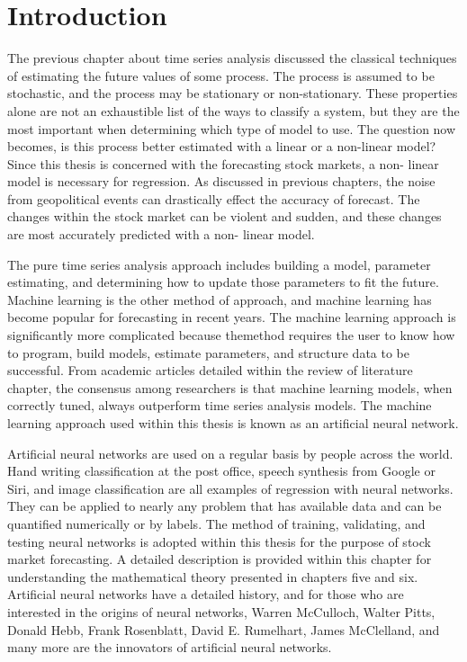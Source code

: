 \documentclass[../main.tex]{subfiles}
\begin{document}
    \section{Introduction}\label{sec:introduction2}
    The previous chapter about time series analysis discussed the classical techniques of estimating the future values of some process.
    The process is assumed to be stochastic, and the process may be stationary or non-stationary.
    These properties alone are not an exhaustible list of the ways to classify a system, but they are the most important when determining which type of model to use.
    The question now becomes, is this process better estimated with a linear or a non-linear model?
    Since this thesis is concerned with the forecasting stock markets, a non- linear model is necessary for regression.
    As discussed in previous chapters, the noise from geopolitical events can drastically effect the accuracy of forecast.
    The changes within the stock market can be violent and sudden, and these changes are most accurately predicted with a non- linear model.

    The pure time series analysis approach includes building a model, parameter estimating, and determining how to update those parameters to fit the future.
    Machine learning is the other method of approach, and machine learning has become popular for forecasting in recent years.
    The machine learning approach is significantly more complicated because themethod requires the user to know how to program, build models, estimate parameters, and structure data to be successful.
    From academic articles detailed within the review of literature chapter, the consensus among researchers is that machine learning models, when correctly tuned, always outperform time series analysis models.
    The machine learning approach used within this thesis is known as an artificial neural network.

    Artificial neural networks are used on a regular basis by people across the world.
    Hand writing classification at the post office, speech synthesis from Google or Siri, and image classification are all examples of regression with neural networks.
    They can be applied to nearly any problem that has available data and can be quantified numerically or by labels.
    The method of training, validating, and testing neural networks is adopted within this thesis for the purpose of stock market forecasting.
    A detailed description is provided within this chapter for understanding the mathematical theory presented in chapters five and six.
    Artificial neural networks have a detailed history, and for those who are interested in the origins of neural networks, Warren McCulloch, Walter Pitts, Donald Hebb, Frank Rosenblatt, David E. Rumelhart, James McClelland, and many more are the innovators of artificial neural networks.
\end{document}
